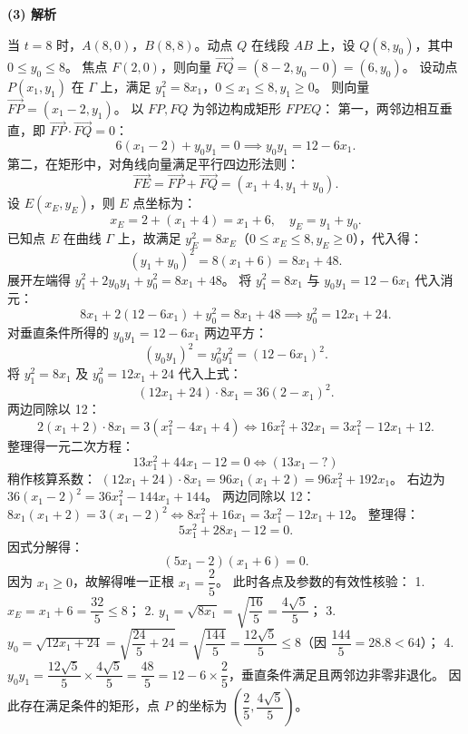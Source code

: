 \begin{answer}
\textbf{(3) 解析}

当 $t = 8$ 时，$A(8, 0)$，$B(8, 8)$。动点 $Q$ 在线段 $AB$ 上，设 $Q(8, y_0)$，其中 $0 \le y_0 \le 8$。
焦点 $F(2, 0)$，则向量 $\vec{FQ} = (8 - 2, y_0 - 0) = (6, y_0)$。
设动点 $P(x_1, y_1)$ 在 $\Gamma$ 上，满足 $y_1^2 = 8x_1$，$0 \le x_1 \le 8, y_1 \ge 0$。
则向量 $\vec{FP} = (x_1 - 2, y_1)$。
以 $FP, FQ$ 为邻边构成矩形 $FPEQ$：
第一，两邻边相互垂直，即 $\vec{FP} \cdot \vec{FQ} = 0$：
\nopagebreak[4]
\[6(x_1 - 2) + y_0 y_1 = 0 \implies y_0 y_1 = 12 - 6x_1.\]
第二，在矩形中，对角线向量满足平行四边形法则：
\nopagebreak[4]
\[\vec{FE} = \vec{FP} + \vec{FQ} = (x_1 + 4, y_1 + y_0).\]
设 $E(x_E, y_E)$，则 $E$ 点坐标为：
\nopagebreak[4]
\[x_E = 2 + (x_1 + 4) = x_1 + 6, \quad y_E = y_1 + y_0.\]
已知点 $E$ 在曲线 $\Gamma$ 上，故满足 $y_E^2 = 8x_E$（$0 \le x_E \le 8, y_E \ge 0$），代入得：
\nopagebreak[4]
\[(y_1 + y_0)^2 = 8(x_1 + 6) = 8x_1 + 48.\]
展开左端得 $y_1^2 + 2y_0 y_1 + y_0^2 = 8x_1 + 48$。
将 $y_1^2 = 8x_1$ 与 $y_0 y_1 = 12 - 6x_1$ 代入消元：
\nopagebreak[4]
\[8x_1 + 2(12 - 6x_1) + y_0^2 = 8x_1 + 48 \implies y_0^2 = 12x_1 + 24.\]
对垂直条件所得的 $y_0 y_1 = 12 - 6x_1$ 两边平方：
\nopagebreak[4]
\[(y_0 y_1)^2 = y_0^2 y_1^2 = (12 - 6x_1)^2.\]
将 $y_1^2 = 8x_1$ 及 $y_0^2 = 12x_1 + 24$ 代入上式：
\nopagebreak[4]
\[(12x_1 + 24) \cdot 8x_1 = 36(2 - x_1)^2.\]
两边同除以 12：
\nopagebreak[4]
\[2(x_1 + 2) \cdot 8x_1 = 3(x_1^2 - 4x_1 + 4) \iff 16x_1^2 + 32x_1 = 3x_1^2 - 12x_1 + 12.\]
整理得一元二次方程：
\nopagebreak[4]
\[13x_1^2 + 44x_1 - 12 = 0 \iff (13x_1 - ?)\]
稍作核算系数：
$(12x_1 + 24) \cdot 8x_1 = 96x_1(x_1 + 2) = 96x_1^2 + 192x_1$。
右边为 $36(x_1 - 2)^2 = 36x_1^2 - 144x_1 + 144$。
两边同除以 12：
$8x_1(x_1 + 2) = 3(x_1 - 2)^2 \iff 8x_1^2 + 16x_1 = 3x_1^2 - 12x_1 + 12$。
整理得：
\nopagebreak[4]
\[5x_1^2 + 28x_1 - 12 = 0.\]
因式分解得：
\nopagebreak[4]
\[(5x_1 - 2)(x_1 + 6) = 0.\]
因为 $x_1 \ge 0$，故解得唯一正根 $x_1 = \dfrac{2}{5}$。
此时各点及参数的有效性核验：
1. $x_E = x_1 + 6 = \dfrac{32}{5} \le 8$；
2. $y_1 = \sqrt{8x_1} = \sqrt{\dfrac{16}{5}} = \dfrac{4\sqrt{5}}{5}$；
3. $y_0 = \sqrt{12x_1 + 24} = \sqrt{\dfrac{24}{5} + 24} = \sqrt{\dfrac{144}{5}} = \dfrac{12\sqrt{5}}{5} \le 8$（因 $\dfrac{144}{5} = 28.8 < 64$）；
4. $y_0 y_1 = \dfrac{12\sqrt{5}}{5} \times \dfrac{4\sqrt{5}}{5} = \dfrac{48}{5} = 12 - 6 \times \dfrac{2}{5}$，垂直条件满足且两邻边非零非退化。
因此存在满足条件的矩形，点 $P$ 的坐标为 $\left(\dfrac{2}{5}, \dfrac{4\sqrt{5}}{5}\right)$。




\end{answer}
